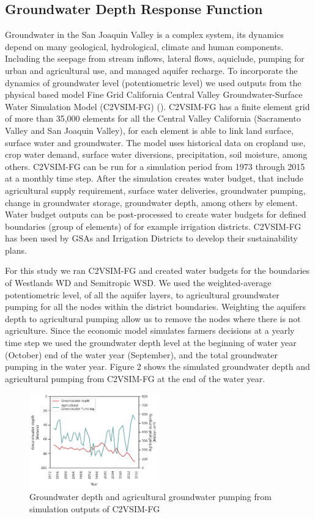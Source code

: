 \documentclass[11pt,a4paper]{article}
\begin{document}
\subsection{Groundwater Depth Response Function}

Groundwater in the San Joaquin Valley is a complex system, its dynamics depend on many geological, hydrological, climate and human components. Including the seepage from stream inflows, lateral flows, aquiclude, pumping for urban and agricultural use, and managed aquifer recharge. To incorporate the dynamics of groundwater level (potentiometric level) we used outputs from the physical based model Fine Grid California Central Valley Groundwater-Surface Water Simulation Model (C2VSIM-FG) (\cite{brush_users_2013}). C2VSIM-FG has a finite element grid of more than 35,000 elements for all the Central Valley California (Sacramento Valley and San Joaquin Valley), for each element is able to link land surface, surface water and groundwater. The model uses historical data on cropland use, crop water demand, surface water diversions, precipitation, soil moisture, among others. C2VSIM-FG can be run for a simulation period from 1973 through 2015 at a monthly time step. After the simulation creates water budget, that include agricultural supply requirement, surface water deliveries, groundwater pumping, change in groundwater storage, groundwater depth, among others by element. Water budget outputs can be post-processed to create water budgets for defined boundaries (group of elements) of for example irrigation districts. C2VSIM-FG has been used by GSAs and Irrigation Districts to develop their sustainability plans.

For this study we ran C2VSIM-FG and created water budgets for the boundaries of Westlands WD and Semitropic WSD. We used the weighted-average potentiometric level, of all the aquifer layers, to agricultural groundwater pumping for all the nodes within the district boundaries. Weighting the aquifers depth to agricultural pumping allow us to remove the nodes where there is not agriculture. Since the economic model simulates farmers decisions at a yearly time step we used the groundwater depth level at the beginning of water year (October) end of the water year (September), and the total groundwater pumping in the water year. Figure 2 shows the simulated groundwater depth and agricultural pumping from C2VSIM-FG at the end of the water year. 

\begin{figure}[H]
    \centering
    \includegraphics[width=0.5\textwidth]{c2vsim_semitropic.png}
    \caption{Groundwater depth and agricultural groundwater pumping from simulation outputs of C2VSIM-FG}
    \label{fig:mes1h1}
\end{figure}
\end{document}
